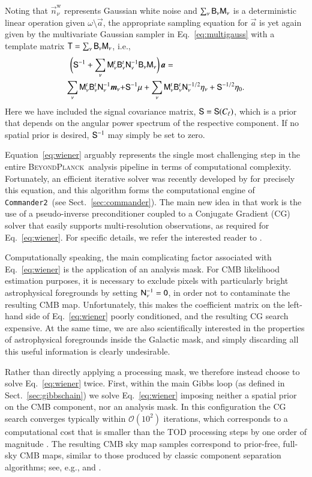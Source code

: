 \documentclass[onecolumn]{aa}
\def\commandertwo{\texttt{Commander2}}
\newcommand{\n}[0]{\vec{n}}
\renewcommand{\a}[0]{\vec{a}}
\newcommand{\m}[0]{\vec{m}}
\newcommand{\B}[0]{\tens{B}}
\newcommand{\T}[0]{\tens{T}}
\newcommand{\N}[0]{\tens{N}}
\newcommand{\M}[0]{\tens{M}}
\renewcommand{\S}[0]{\tens{S}}
\newcommand{\BP}{\textsc{BeyondPlanck}}
\begin{document}
Noting that $\n^{\mathrm{w}}_{\nu}$ represents Gaussian white noise
and $\sum_{\nu}\B_{\nu}\M_{\nu}$ is a deterministic linear operation
given $\omega\setminus\a$, the appropriate sampling equation for $\a$
is yet again given by the multivariate Gaussian sampler in
Eq.~\eqref{eq:multigauss} with a template matrix $\T = \sum_{\nu}\B_{\nu}\M_{\nu}$,
i.e.,
\begin{equation}
    \begin{split}
\biggl(\S^{-1} +
\sum_{\nu}\M^t_{\nu}\B^t_{\nu}&\N_{\nu}^{-1}\B_{\nu}\M_{\nu}\biggr)\,\a
= \\\sum_\nu\M_\nu^t\B_{\nu}^t\N_\nu^{-1}\m_{\nu} + &\S^{-1}\mu + \sum_{\nu}\M_{\nu}^t\B_{\nu}^t\N_{\nu}^{-1/2}\eta_{\nu} +
\S^{-1/2}\eta_{0}.
\label{eq:wiener}
    \end{split}
\end{equation}
Here we have included the signal covariance matrix, $\S=\S(C_{\ell})$,
which is a prior that depends on the angular power spectrum of the
respective component. If no spatial prior is desired, $\S^{-1}$ may
simply be set to zero. 

Equation~\eqref{eq:wiener} arguably represents the single most
challenging step in the entire \BP\ analysis pipeline in terms of
computational complexity. Fortunately, an efficient iterative solver
was recently developed by \citet{seljebotn:2019} for precisely this
equation, and this algorithm forms the computational engine of
\commandertwo\ (see Sect.~\ref{sec:commander}). The main new idea in
that work is the use of a pseudo-inverse preconditioner coupled to a
Conjugate Gradient (CG) solver that easily supports multi-resolution
observations, as required for Eq.~\eqref{eq:wiener}. For specific
details, we refer the interested reader to \citet{seljebotn:2019}.

Computationally speaking, the main complicating factor associated with
Eq.~\eqref{eq:wiener} is the application of an analysis mask. For CMB
likelihood estimation purposes, it is necessary to exclude pixels with
particularly bright astrophysical foregrounds by setting
$\N_{\nu}^{-1}=\tens 0$, in order not to contaminate the resulting CMB
map. Unfortunately, this makes the coefficient matrix on the left-hand
side of Eq.~\eqref{eq:wiener} poorly conditioned, and the resulting CG
search expensive. At the same time, we are also scientifically
interested in the properties of astrophysical foregrounds inside the Galactic
mask, and simply discarding all this useful information is clearly
undesirable.

Rather than directly applying a processing mask, we therefore instead
choose to solve Eq.~\eqref{eq:wiener} twice. First, within the main
Gibbs loop (as defined in Sect.~\ref{sec:gibbschain}) we solve
Eq.~\eqref{eq:wiener} imposing neither a spatial prior on the CMB
component, nor an analysis mask. In this configuration the CG search
converges typically within $\mathcal{O}(10^2)$ iterations, which
corresponds to a computational cost that is smaller than the TOD
processing steps by one order of magnitude \citep{bp03}. The resulting
CMB sky map samples correspond to prior-free, full-sky CMB maps,
similar to those produced by classic component separation algorithms;
see, e.g., \citet{planck2014-a11} and \citet{planck2016-l04}.
\end{document}
